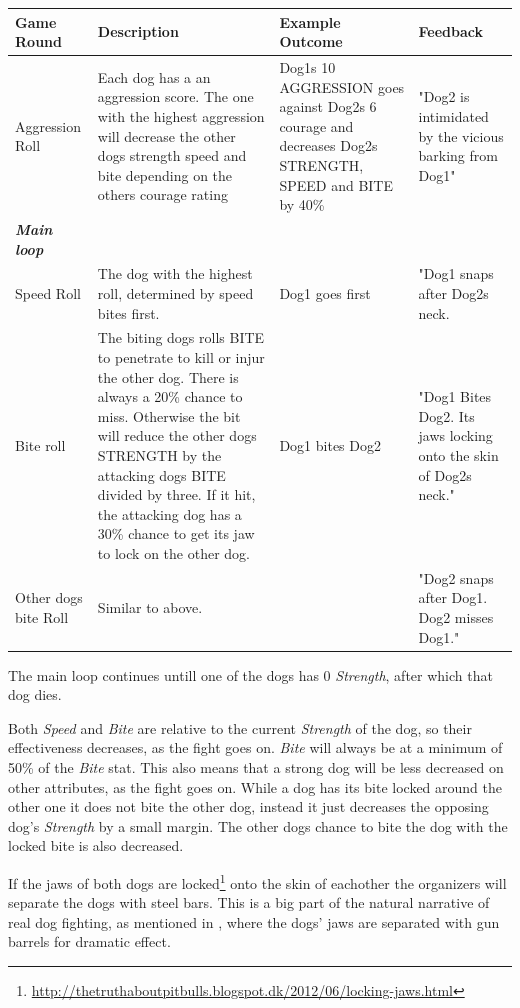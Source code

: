 \begin{center}
\scriptsize 
	\begin{tabular}{|l|p{5cm}|p{3cm}|p{3cm}|} 
		\hline
		\textbf{Game Round} & \textbf{Description} & \textbf{Example Outcome} &\textbf{ Feedback }\\ [0.5ex] 
		\hline\hline
		Aggression Roll & Each dog has a an aggression score. The one with the highest aggression will decrease the other dogs strength speed and bite depending on the others courage rating & Dog1s 10 AGGRESSION goes against Dog2s 6 courage and decreases Dog2s STRENGTH, SPEED and BITE by 40\% & "Dog2 is intimidated by the vicious barking from Dog1" \\  
		\hline\hline
		\textit{\textbf{Main loop}} \\
		\hline
		Speed Roll	& The dog with the highest roll, determined by speed bites first. &	Dog1 goes first & "Dog1 snaps after Dog2s neck. \\
		\hline
		Bite roll & The biting dogs rolls BITE to penetrate to kill or injur the other dog. There is always a 20\% chance to miss. Otherwise the bit will reduce the other dogs STRENGTH by the attacking dogs BITE divided by three. If it hit, the attacking dog has a 30\% chance to get its jaw to lock on the other dog. & Dog1 bites Dog2 & "Dog1 Bites Dog2. Its jaws locking onto the skin of Dog2s neck." \\
		\hline
		Other dogs bite Roll & Similar to above. & & "Dog2 snaps after Dog1. Dog2 misses Dog1." \\
		\hline
	\end{tabular}
\end{center}

The main loop continues untill one of the dogs has 0 \textit{Strength}, after which that dog dies.\

Both \textit{Speed} and \textit{Bite} are relative to the current \textit{Strength} of the dog, so their effectiveness decreases, as the fight goes on. \textit{Bite} will always be at a minimum of 50\% of the \textit{Bite} stat. This also means that a strong dog will be less decreased on other attributes, as the fight goes on. While a dog has its bite locked around the other one it does not bite the other dog, instead it just decreases the opposing dog's \textit{Strength} by a small margin. The other dogs chance to bite the dog with the locked bite is also decreased.\

If the jaws of both dogs are locked\footnote{\url{http://thetruthaboutpitbulls.blogspot.dk/2012/06/locking-jaws.html}} onto the skin of eachother the organizers will separate the dogs with steel bars. This is a big part of the natural narrative of real dog fighting, as mentioned in \citep{london1997call}, where the dogs' jaws are separated with gun barrels for dramatic effect.\

